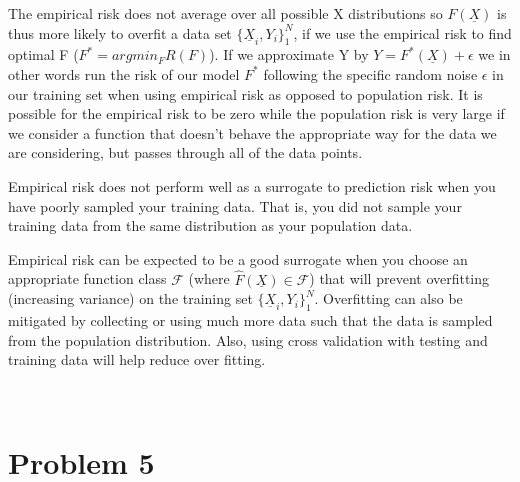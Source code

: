 \documentclass[11pt]{article}
\begin{document}
\vspace{5 mm}
\noindent
The empirical risk does not average over all possible X distributions so 
$F(\underline{X})$ is thus more likely to overfit a data set 
$\{\underline{X}_i, Y_i\}_1^N$, if we use the empirical risk to find optimal F 
($F^* = argmin_FR(F)$). If we approximate Y by 
$Y=F^*(\underline{X}) + \epsilon$ we in other words run the risk of our model 
$F^*$ following the specific random noise $\epsilon$ in our training set when 
using empirical risk as opposed to population risk. It is possible for the 
empirical risk to be zero while the population risk is very large if we 
consider a function that doesn't behave the appropriate way for the data we are 
considering, but passes through all of the  data points. 

\vspace{5 mm}
\noindent
Empirical risk does not perform well as a surrogate to prediction risk when 
you have poorly sampled your training data. That is, you did not sample your 
training data from the same distribution as your population data.

\vspace{5 mm}
\noindent
Empirical risk can be expected to be a good surrogate when you choose an 
appropriate function class $\mathscr{F}$ (where 
$\hat{F}(\underline{X}) \in \mathscr{F}$) that will prevent overfitting 
(increasing variance) on the training set $\{\underline{X}_i, Y_i\}_1^N$. 
Overfitting can also be mitigated by collecting or using much more data such 
that the data is sampled from the population distribution. Also, using cross 
validation with testing and training data will help reduce over fitting.

\newpage
\begin{center}
\ \\
\end{center}

\section*{Problem 5}
\end{document}
